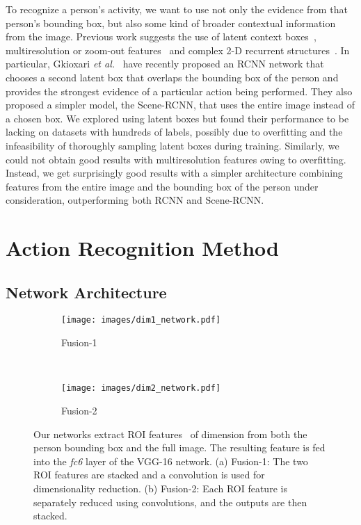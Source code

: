 \documentclass[runningheads]{llncs}
\begin{document}
To recognize a person's activity, we want to use not only the evidence from that person's bounding box, but also some kind of broader contextual information from the image. Previous work suggests the use of latent context boxes~\cite{gkioxari2015rstarcnn}, multiresolution or zoom-out features~\cite{bell2015InsideOutside,mostajabi2015feedforward} and complex 2-D recurrent structures~\cite{bell2015InsideOutside}. In particular, Gkioxari \emph{et al.}~\cite{gkioxari2015rstarcnn} have recently proposed an RCNN network that chooses a second latent box that overlaps the bounding box of the person and provides the strongest evidence of a particular action being performed. They also proposed a simpler model, the Scene-RCNN, that uses the entire image instead of a chosen box.
We explored using latent boxes but found their performance to be lacking on datasets with hundreds of labels, possibly due to overfitting and the infeasibility of thoroughly sampling latent boxes during training. Similarly, we could not obtain good results with multiresolution features owing to overfitting. Instead, we get surprisingly good results with a simpler architecture combining features from the entire image and the bounding box of the person under consideration, outperforming both RCNN and Scene-RCNN. 





 

\section{Action Recognition Method}
\label{sec:method}


\subsection{Network Architecture}
\label{subsec:context}


\begin{figure}[h!]
    \centering
    
    \begin{subfigure}[t]{0.49\linewidth}
        \centering
        \texttt{[image: images/dim1\_network.pdf]}
\caption{Fusion-1\\}
        \label{fig:network1}
    \end{subfigure}~ 
    \begin{subfigure}[t]{0.49\linewidth}
        \centering
        \texttt{[image: images/dim2\_network.pdf]}
\caption{Fusion-2\\}
        \label{fig:network2}
    \end{subfigure}
    \caption{Our networks extract ROI features~\cite{girshick2015fast} of dimension  from both the person bounding box and the full image.  The resulting feature is fed into the \emph{fc6} layer of the VGG-16 network. (a) Fusion-1: The two ROI features are stacked and a  convolution is used for dimensionality reduction. (b) Fusion-2: Each ROI feature is separately reduced using  convolutions, and the outputs are then stacked.}
    \label{fig:network}
\end{figure}
\end{document}
